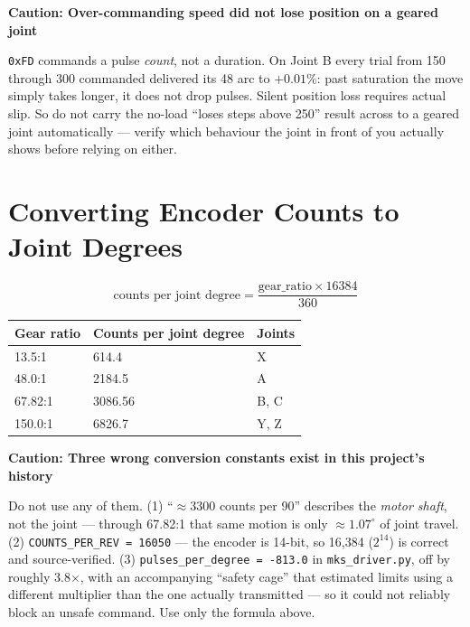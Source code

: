 \documentclass[11pt,letterpaper]{article}
\newenvironment{caution}[1]{%
    \par\addvspace{8pt}%
    \noindent{\color{cautionred}\rule{\linewidth}{0.8pt}}\par\vspace{2pt}
    \noindent\textbf{\color{cautionred}Caution: #1}\par\vspace{2pt}
}{%
    \par\vspace{2pt}\noindent{\color{cautionred}\rule{\linewidth}{0.4pt}}%
    \par\addvspace{8pt}%
}
\begin{document}
\begin{caution}{Over-commanding speed did not lose position on a geared joint}
\texttt{0xFD} commands a pulse \emph{count}, not a duration. On Joint B every trial
from 150 through 300 commanded delivered its 48\textdegree{} arc to $+0.01\%$: past
saturation the move simply takes longer, it does not drop pulses. Silent position
loss requires actual slip. So do not carry the no-load ``loses steps above 250''
result across to a geared joint automatically --- verify which behaviour the joint
in front of you actually shows before relying on either.
\end{caution}

\section{Converting Encoder Counts to Joint Degrees}

\[
\text{counts per joint degree} = \frac{\text{gear\_ratio} \times 16384}{360}
\]

\begin{table}[h]
\centering
\begin{tabular}{lll}
\toprule
\textbf{Gear ratio} & \textbf{Counts per joint degree} & \textbf{Joints} \\ \midrule
13.5:1   & 614.4    & X \\
48.0:1   & 2184.5   & A \\
67.82:1  & 3086.56  & B, C \\
150.0:1  & 6826.7   & Y, Z \\
\bottomrule
\end{tabular}
\end{table}

\begin{caution}{Three wrong conversion constants exist in this project's history}
Do not use any of them. (1) ``$\approx$3300 counts per 90\textdegree'' describes the
\emph{motor shaft}, not the joint --- through 67.82:1 that same motion is only
$\approx 1.07^\circ$ of joint travel. (2) \texttt{COUNTS\_PER\_REV = 16050} --- the
encoder is 14-bit, so 16{,}384 ($2^{14}$) is correct and source-verified.
(3) \texttt{pulses\_per\_degree = -813.0} in \texttt{mks\_driver.py}, off by roughly
3.8$\times$, with an accompanying ``safety cage'' that estimated limits using a
different multiplier than the one actually transmitted --- so it could not reliably
block an unsafe command. Use only the formula above.
\end{caution}
\end{document}
